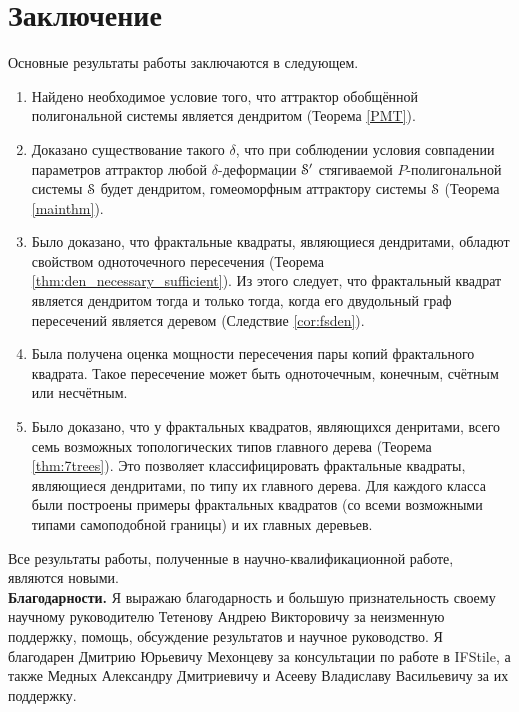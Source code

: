 \chapter*{Заключение}                       %


Основные результаты работы заключаются в следующем.

\begin{enumerate}
\item Найдено необходимое условие того, что аттрактор обобщённой полигональной системы является дендритом (Теорема \ref{PMT}). 

\item Доказано существование такого $\delta$, что при соблюдении условия совпадении параметров аттрактор любой $\delta$-деформации ${\EuScript S}'$ стягиваемой $P$-полигональной системы ${\EuScript S}$ будет дендритом, гомеоморфным аттрактору системы ${\EuScript S}$ (Теорема \ref{mainthm}).



\item Было доказано, что фрактальные квадраты, являющиеся дендритами, обладют свойством одноточечного пересечения (Теорема \ref{thm:den_necessary_sufficient}).
Из этого следует, что фрактальный квадрат является дендритом тогда и только тогда, когда его двудольный граф пересечений является деревом (Следствие \ref{cor:fsden}).

\item Была получена оценка мощности пересечения пары копий фрактального квадрата.
Такое пересечение может быть одноточечным, конечным, счётным или несчётным.

\item Было доказано, что у фрактальных квадратов, являющихся денритами, всего семь возможных топологических типов главного дерева (Теорема \ref{thm:7trees}).
Это позволяет классифицировать фрактальные квадраты, являющиеся дендритами, по типу их главного дерева.
Для каждого класса были построены примеры фрактальных квадратов (со всеми возможными типами самоподобной границы) и их главных деревьев.
\end{enumerate}

Все результаты работы, полученные в научно-квалификационной работе, являются новыми.
\\

\textbf{Благодарности.}
Я выражаю благодарность и большую признательность своему научному руководителю
Тетенову Андрею Викторовичу за неизменную поддержку, помощь, обсуждение результатов и научное
руководство.
Я благодарен Дмитрию Юрьевичу Мехонцеву за консультации по работе в IFStile, а также Медных Александру Дмитриевичу и Асееву Владиславу Васильевичу за их поддержку.